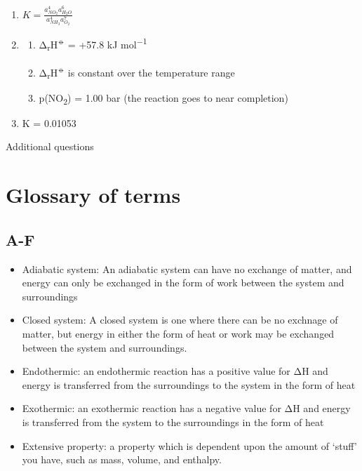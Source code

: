 \documentclass[
]{book}
\providecommand{\tightlist}{%
  \setlength{\itemsep}{0pt}\setlength{\parskip}{0pt}}
\begin{document}
\begin{enumerate}
\def\labelenumi{\arabic{enumi}.}
\item
  \(K = \frac{a_{NO_2}^4 a_{H_2O}^6}{a_{NH_3}^4 a_{O_2}^7}\)
\item
  \begin{enumerate}
  \def\labelenumii{\alph{enumii}.}
  \tightlist
  \item
    Δ\textsubscript{r}H\textsuperscript{⦵} = +57.8 kJ mol\textsuperscript{−1}
  \item
    Δ\textsubscript{r}H\textsuperscript{⦵} is constant over the temperature range
  \item
    p(NO\textsubscript{2}) = 1.00 bar (the reaction goes to near completion)
  \end{enumerate}
\item
  K = 0.01053
\end{enumerate}

Additional questions

\hypertarget{glossary-of-terms}{%
\chapter*{Glossary of terms}\label{glossary-of-terms}}

\hypertarget{a-f}{%
\section*{A-F}\label{a-f}}

\begin{itemize}
\item
  Adiabatic system: An adiabatic system can have no exchange of matter, and energy can only be exchanged in the form of work between the system and surroundings
\item
  Closed system: A closed system is one where there can be no exchnage of matter, but energy in either the form of heat or work may be exchanged between the system and surroundings.
\item
  Endothermic: an endothermic reaction has a positive value for ΔH and energy is transferred from the surroundings to the system in the form of heat
\item
  Exothermic: an exothermic reaction has a negative value for ΔH and energy is transferred from the system to the surroundings in the form of heat
\item
  Extensive property: a property which is dependent upon the amount of `stuff' you have, such as mass, volume, and enthalpy.
\end{itemize}
\end{document}

